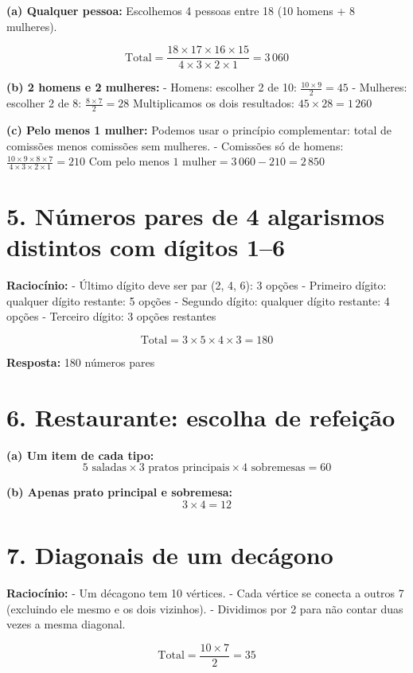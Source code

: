 \documentclass[12pt,a4paper]{article}
\begin{document}
\textbf{(a) Qualquer pessoa:}  
Escolhemos 4 pessoas entre 18 (10 homens + 8 mulheres).  

\[
\text{Total} = \frac{18 \times 17 \times 16 \times 15}{4 \times 3 \times 2 \times 1} = 3\,060
\]

\textbf{(b) 2 homens e 2 mulheres:}  
- Homens: escolher 2 de 10: \(\frac{10 \times 9}{2} = 45\)  
- Mulheres: escolher 2 de 8: \(\frac{8 \times 7}{2} = 28\)  
Multiplicamos os dois resultados: \(45 \times 28 = 1\,260\)

\textbf{(c) Pelo menos 1 mulher:}  
Podemos usar o princípio complementar: total de comissões menos comissões sem mulheres.  
- Comissões só de homens: \(\frac{10 \times 9 \times 8 \times 7}{4 \times 3 \times 2 \times 1} = 210\)  
\(\text{Com pelo menos 1 mulher} = 3\,060 - 210 = 2\,850\)

\section*{5. Números pares de 4 algarismos distintos com dígitos 1--6}

\textbf{Raciocínio:}  
- Último dígito deve ser par (2, 4, 6): 3 opções  
- Primeiro dígito: qualquer dígito restante: 5 opções  
- Segundo dígito: qualquer dígito restante: 4 opções  
- Terceiro dígito: 3 opções restantes  

\[
\text{Total} = 3 \times 5 \times 4 \times 3 = 180
\]

\textbf{Resposta:} 180 números pares

\section*{6. Restaurante: escolha de refeição}

\textbf{(a) Um item de cada tipo:}  
\[
5 \text{ saladas} \times 3 \text{ pratos principais} \times 4 \text{ sobremesas} = 60
\]

\textbf{(b) Apenas prato principal e sobremesa:}  
\[
3 \times 4 = 12
\]

\section*{7. Diagonais de um decágono}

\textbf{Raciocínio:}  
- Um décagono tem 10 vértices.  
- Cada vértice se conecta a outros 7 (excluindo ele mesmo e os dois vizinhos).  
- Dividimos por 2 para não contar duas vezes a mesma diagonal.  

\[
\text{Total} = \frac{10 \times 7}{2} = 35
\]
\end{document}
